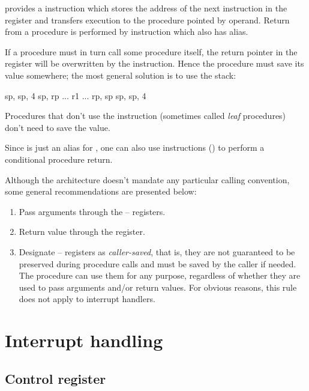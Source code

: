 \documentclass[a4paper,12pt,twoside,extrafontsizes]{memoir}
\begin{document}
\lxp{} provides a  instruction which stores the address of the next instruction in the  register and transfers execution to the procedure pointed by  operand. Return from a procedure is performed by  instruction which also has  alias.

If a procedure must in turn call some procedure itself, the return pointer in the  register will be overwritten by the  instruction. Hence the procedure must save its value somewhere; the most general solution is to use the stack:

\begin{codepar}
     sp, sp, 4
     sp, rp
    ...
     r1
    ...
     rp, sp
     sp, sp, 4
\end{codepar}

Procedures that don't use the  instruction (sometimes called \emph{leaf} procedures) don't need to save the  value.

Since  is just an alias for , one can also use  instructions () to perform a conditional procedure return.

Although the \lxp{} architecture doesn't mandate any particular calling convention, some general recommendations are presented below:

\begin{enumerate}
	\item Pass arguments through the -- registers.
	\item Return value through the  register.
	\item Designate -- registers as \emph{caller-saved}, that is, they are not guaranteed to be preserved during procedure calls and must be saved by the caller if needed. The procedure can use them for any purpose, regardless of whether they are used to pass arguments and/or return values. For obvious reasons, this rule does not apply to interrupt handlers.
\end{enumerate}

\section{Interrupt handling}
\label{sec:interrupthandling}

\subsection{Control register}
\end{document}
